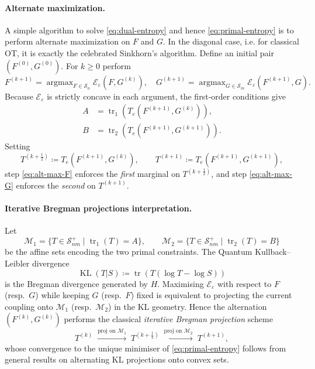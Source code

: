 \documentclass[10pt]{article}
\newcommand{\KL}{\operatorname{KL}}
\newcommand{\Ss}{\mathcal{S}}
\newcommand{\Ee}{\mathcal{E}}
\newcommand{\tr}{\operatorname{tr}}
\newcommand{\argmax}{\operatorname{argmax}}
\renewcommand{\epsilon}{\varepsilon}
\newcommand{\eqdef}{\coloneqq}
\theoremstyle{plain}
\theoremstyle{definition}
\theoremstyle{remark}
\begin{document}
\paragraph{Alternate maximization.}

A simple algorithm to solve \eqref{eq:dual-entropy} and hence \eqref{eq:primal-entropy} is to perform alternate maximization on $F$ and $G$. In the diagonal case, i.e. for classical OT, it is exactly the celebrated Sinkhorn's algorithm. 
%
Define an initial pair $(F^{(0)},G^{(0)})$.  
For $k\ge 0$ perform
\[
	F^{(k+1)} =\argmax_{F\in\Ss_n}\Ee_\epsilon(F,G^{(k)}), 
\quad
G^{(k+1)} =\argmax_{G\in\Ss_m}\Ee_\epsilon(F^{(k+1)},G). 
\]
Because $\Ee_\epsilon$ is strictly concave in each argument, the first‐order conditions give
\begin{align}
	A &=\tr_1(T_e(F^{(k+1)},G^{(k)})), \label{eq:alt-max-F}\\
	B &=\tr_2(T_e(F^{(k+1)},G^{(k+1)})). \label{eq:alt-max-G}
\end{align}
Setting
\[
	T^{(k+\tfrac12)} \coloneqq T_e(F^{(k+1)},G^{(k)}),\qquad
	T^{(k+1)} \coloneqq T_e(F^{(k+1)},G^{(k+1)}),
\]
step \eqref{eq:alt-max-F} enforces the \emph{first} marginal on $T^{(k+\frac12)}$, and
step \eqref{eq:alt-max-G} enforces the \emph{second} on $T^{(k+1)}$.

\paragraph{Iterative Bregman projections interpretation.}

Let
\[
\mathcal{M}_1=\bigl\{T\in\Ss_{nm}^{+}\mid\tr_1(T)=A\bigr\},\qquad
\mathcal{M}_2=\bigl\{T\in\Ss_{nm}^{+}\mid\tr_2(T)=B\bigr\}
\]
be the affine sets encoding the two primal constraints.
The Quantum Kullback–Leibler divergence
\[
\KL(T|S) \eqdef \tr(T(\log T-\log S))
\]
is the Bregman divergence generated by $H$.  
Maximising $\Ee_\epsilon$ with respect to $F$ (resp.\ $G$) while keeping $G$ (resp.\ $F$) fixed
is equivalent to projecting the current coupling onto $\mathcal{M}_1$ (resp.\ $\mathcal{M}_2$)
in the KL geometry.  
Hence the alternation $(F^{(k)},G^{(k)})$ performs the classical
\emph{iterative Bregman projection} scheme
\[
T^{(k)}\;\xrightarrow{\text{proj on }\mathcal{M}_1}\;
T^{(k+\frac12)}\;\xrightarrow{\text{proj on }\mathcal{M}_2}\;
T^{(k+1)},
\]
whose convergence to the unique minimiser of \eqref{eq:primal-entropy}
follows from general results on alternating KL projections onto convex sets.


\end{document}
